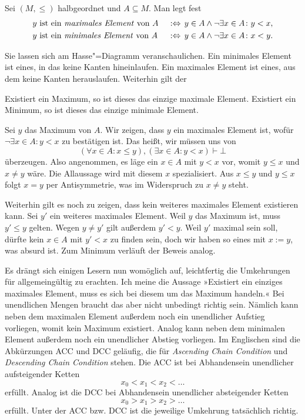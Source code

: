 \begin{Definition}%
\label{def:minimales-Element}%
\newlinefirst
Sei $(M,\le)$ halbgeordnet und $A\subseteq M$. Man legt fest
\begin{alignat*}{2}
&\text{$y$ ist ein \emph{maximales Element} von $A$}\,&&:\Leftrightarrow\,
  y\in A\land\lnot\exists x\in A\colon y<x,\\
&\text{$y$ ist ein \emph{minimales Element} von $A$}\,&&:\Leftrightarrow\,
  y\in A\land\lnot\exists x\in A\colon x<y.
\end{alignat*}
\end{Definition}

\noindent
Sie lassen sich am Hasse"=Diagramm veranschaulichen. Ein minimales
Element ist eines, in das keine Kanten hineinlaufen. Ein maximales
Element ist eines, aus dem keine Kanten herauslaufen. Weiterhin
gilt der

\begin{Satz}
Existiert ein Maximum, so ist dieses das einzige maximale Element.
Existiert ein Minimum, so ist dieses das einzige minimale Element.
\end{Satz}
\begin{Beweis}
Sei $y$ das Maximum von $A$. Wir zeigen, dass $y$ ein maximales
Element ist, wofür $\lnot\exists x\in A\colon y<x$ zu bestätigen ist.
Das heißt, wir müssen uns von
\[(\forall x\in A\colon x\le y),(\exists x\in A\colon y<x)\vdash\bot\]
überzeugen. Also angenommen, es läge ein $x\in A$ mit $y<x$ vor, womit
$y\le x$ und $x\ne y$ wäre. Die Allaussage wird mit diesem $x$
spezialisiert. Aus $x\le y$ und $y\le x$ folgt $x=y$ per Antisymmetrie,
was im Widerspruch zu $x\ne y$ steht.

Weiterhin gilt es noch zu zeigen, dass kein weiteres maximales
Element existieren kann. Sei $y'$ ein weiteres maximales Element.
Weil $y$ das Maximum ist, muss $y'\le y$ gelten. Wegen $y\ne y'$
gilt außerdem $y'<y$. Weil $y'$ maximal sein soll, dürfte kein $x\in A$
mit $y'<x$ zu finden sein, doch wir haben so eines mit $x:=y$, was
absurd ist. Zum Minimum verläuft der Beweis analog.\,\qedsymbol
\end{Beweis}

\noindent
Es drängt sich einigen Lesern nun womöglich auf, leichtfertig die
Umkehrungen für allgemeingültig zu erachten. Ich meine die Aussage
»Existiert ein einziges maximales Element, muss es sich bei diesem um
das Maximum handeln.« Bei unendlichen Mengen braucht das aber nicht
unbedingt richtig sein. Nämlich kann neben dem maximalen Element
außerdem noch ein unendlicher Aufstieg vorliegen, womit kein
Maximum existiert. Analog kann neben dem minimalen Element außerdem
noch ein unendlicher Abstieg vorliegen. Im Englischen sind die
Abkürzungen ACC und DCC geläufig, die für \emph{Ascending Chain Condition}
und \emph{Descending Chain Condition}
stehen. Die ACC ist bei Abhandensein unendlicher aufsteigender Ketten
\[x_0<x_1<x_2<\ldots\]
erfüllt. Analog ist die DCC bei Abhandensein unendlicher absteigender
Ketten
\[x_0>x_1>x_2>\ldots\]
erfüllt. Unter der ACC bzw. DCC ist die jeweilige Umkehrung tatsächlich
richtig.

